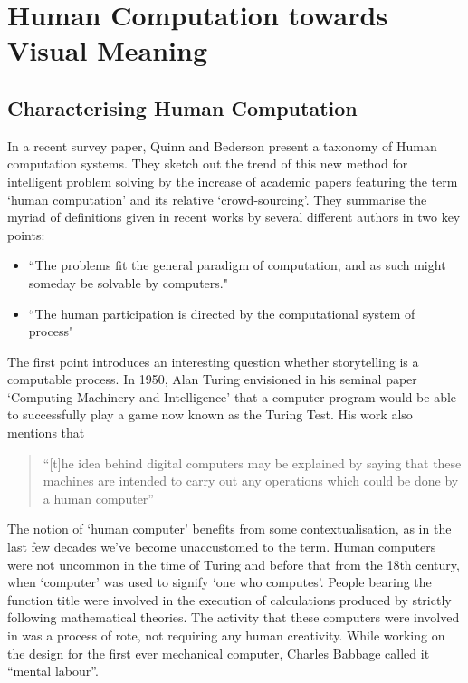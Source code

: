 \chapter{Human Computation towards Visual Meaning}
\label{ch:humancomputation}

 

\section{Characterising Human Computation}

In a recent survey paper, Quinn and Bederson present a taxonomy of Human computation systems\cite{Quinn:2011us}. They sketch out the trend of this new method for intelligent problem solving by the increase of academic papers featuring the term `human computation' and its relative `crowd-sourcing'. They summarise the myriad of definitions given in recent works by several different authors in two key points:

\begin{itemize}
  \item ``The problems fit  the general paradigm of computation, and as such might someday be solvable by computers."
  \item ``The human participation is directed by the computational system of process"
\end{itemize}

The first point introduces an interesting question whether storytelling is a computable process.
In 1950, Alan Turing envisioned in his seminal paper `Computing Machinery and Intelligence' that a computer program would be able to successfully play a game now known as the Turing Test. His work also mentions that 

\begin{quote}
  ``[t]he idea behind digital computers may be explained by saying that these machines are intended to carry out any operations which could be done by a human computer''\cite{Turing:1950wi}
\end{quote}

The notion of `human computer' benefits from some contextualisation, as in the last few decades we've become unaccustomed to the term. Human computers were not uncommon in the time of Turing and before that from the 18th century, when `computer' was used to signify `one who computes'\cite{grier2007computers}. People bearing the function title were involved in the execution of calculations produced by strictly following mathematical theories. The activity that these computers were involved in was a process of rote, not requiring any human creativity. While working on the design for the first ever mechanical computer, Charles Babbage called it ``mental labour''\cite[Ch.\ 20]{Babbage:1832vu}.

